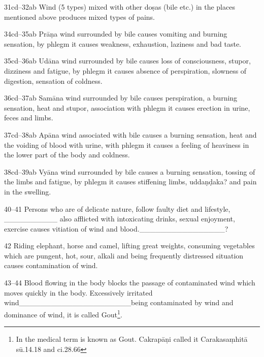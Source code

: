 \begin{translation}
\item[31cd--32ab] Wind (5 types) mixed with other doṣas (bile etc.) in the 
places mentioned above produces mixed types of pains.

\item[34cd--35ab] Prāṇa wind surrounded by bile causes vomiting and burning 
sensation, by phlegm it causes weakness, exhaustion, laziness and bad taste. 

\item[35cd--36ab] Udāna wind surrounded by bile causes loss of 
consciousness, stupor, dizziness and fatigue, by phlegm it causes absence of 
perspiration, slowness of digestion, sensation of coldness.

\item[36cd--37ab] Samāna wind surrounded by bile causes perspiration, a 
burning sensation, heat and stupor, association with phlegm it causes erection 
in 
urine, feces and limbs.  

\item[37cd--38ab] Apāna wind associated with bile causes a burning sensation, 
heat and the voiding of blood with urine, with phlegm it causes a feeling of 
heaviness in the lower part of the body and coldness.

\item[38cd--39ab] Vyāna wind surrounded by bile causes a burning sensation, 
tossing of the limbs and fatigue, by phlegm it causes stiffening limbs, 
uddaṇḍaka? and pain in the swelling.

\item[40--41] Persons who are of delicate nature, follow faulty diet and lifestyle, 
\_\_\_\_\_\_\_\_\_\_  also afflicted with intoxicating drinks, 	sexual enjoyment, 
exercise causes vitiation of wind and 
blood.\_\_\_\_\_\_\_\_\_\_\_\_\_\_\_\_?

\item[42] Riding elephant, horse and camel, lifting great weights, consuming vegetables which are pungent, hot, sour, alkali and being frequently distressed situation causes contamination of wind. 

\item[43--44] Blood flowing in the body blocks the passage of contaminated wind 
which moves quickly in the body. Excessively irritated 
wind\_\_\_\_\_\_\_\_\_\_\_\_\_\_\_\_\_\_\_\_\_being contaminated by wind and dominance 
of wind, it 
is called  Gout\footnote{In the medical term  is known as 
Gout. Cakrapāṇi called it  Carakasaṃhitā sū.14.18 and ci.28.66}.


\end{translation}
